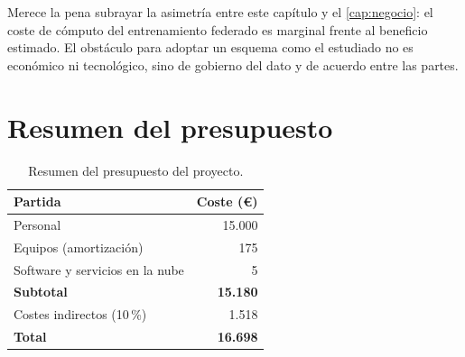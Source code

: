Merece la pena subrayar la asimetría entre este capítulo y el
\cref{cap:negocio}: el coste de cómputo del entrenamiento federado es marginal frente al beneficio
estimado. El obstáculo para adoptar un esquema como el estudiado no es económico ni tecnológico,
sino de gobierno del dato y de acuerdo entre las partes.

\section{Resumen del presupuesto}

\begin{table}[H]
  \centering
  \caption[Resumen del presupuesto]{Resumen del presupuesto del proyecto.}
  \label{tab:presupuesto_resumen}
  \begin{tabular}{lr}
    \toprule
    Partida & Coste (€) \\
    \midrule
    Personal                       & 15.000 \\
    Equipos (amortización)         &    175 \\
    Software y servicios en la nube &      5 \\
    \midrule
    \textbf{Subtotal}              & \textbf{15.180} \\
    Costes indirectos (10\,\%)     &  1.518 \\
    \midrule
    \textbf{Total}                 & \textbf{16.698} \\
    \bottomrule
  \end{tabular}
\end{table}
